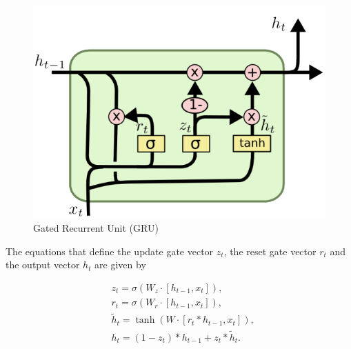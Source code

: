 \documentclass[main]{subfiles}
\begin{document}
\begin{figure}[H]
    \centering
    \includegraphics[width=0.6\linewidth]{13_LearningInRecurrentNeuronalNetworks/figures/gru.png}
    \caption{Gated Recurrent Unit (GRU)}
    \label{fig:lstm_many}
\end{figure}

The equations that define the update gate vector $z_t$, the reset gate vector $r_t$ and the output vector $h_t$ are given by

\begin{align*}
&z_{t}=\sigma\left(W_{z} \cdot\left[h_{t-1}, x_{t}\right]\right),\\
&r_{t}=\sigma\left(W_{r} \cdot\left[h_{t-1}, x_{t}\right]\right),\\
&\tilde{h}_{t}=\tanh \left(W \cdot\left[r_{t} * h_{t-1}, x_{t}\right]\right),\\
&h_{t}=\left(1-z_{t}\right) * h_{t-1}+z_{t} * \tilde{h}_{t}.
\end{align*}
\end{document}
